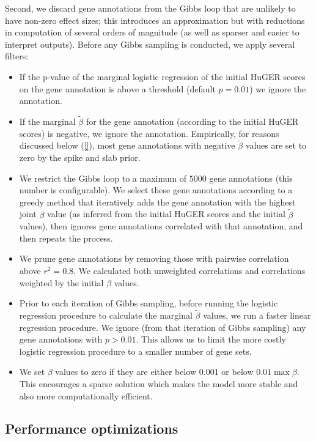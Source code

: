 \documentclass[11pt]{article}
\begin{document}
{Second, we discard gene annotations from the Gibbs loop that are
unlikely to have non-zero effect sizes; this introduces an
approximation but with reductions in computation of several orders of
magnitude (as well as sparser and easier to interpret outputs). Before
any Gibbs sampling is conducted, we apply several filters:
\begin{itemize}
  \item If the p-value of the marginal logistic regression of the
    initial HuGER scores on the gene annotation is above a threshold
    (default $p=0.01$) we ignore the annotation.
  \item If the marginal $\tilde{\beta}$ for the gene annotation
    (according to the initial HuGER scores) is negative, we ignore the
    annotation. Empirically, for reasons discussed below (\ref{}),
    most gene annotations with negative $\tilde{\beta}$ values are set
    to zero by the spike and slab prior.
  \item We restrict the Gibbs loop to a maximum of $5000$ gene
    annotations (this number is configurable). We select these gene
    annotations according to a greedy method that iteratively adds the
    gene annotation with the highest joint $\beta$ value (as inferred from
    the initial HuGER scores and the initial $\tilde{\beta}$ values),
    then ignores gene annotations correlated with that annotation, and
    then repeats the process.
  \item We prune gene annotations by removing those with pairwise
    correlation above $r^2=0.8$. We calculated both unweighted
    correlations and correlations weighted by the initial $\beta$
    values.
  \item Prior to each iteration of Gibbs sampling, before running the
    logistic regression procedure to calculate the marginal
    $\tilde{\beta}$ values, we run a faster linear regression
    procedure. We ignore (from that iteration of Gibbs sampling) any
    gene annotations with $p>0.01$. This allows us to limit the more
    costly logistic regression procedure to a smaller number of gene sets.
  \item We set $\beta$ values to zero if they are either below 0.001 or
below $0.01\max{\beta}$. This encourages a sparse solution which makes
the model more stable and also more computationally efficient.

\end{itemize}

\subsection{Performance optimizations}
\label{sec:performance-optimizations}

}
\end{document}
